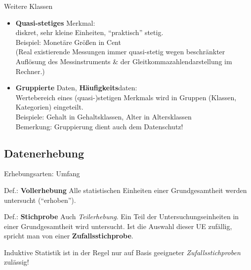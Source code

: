 \documentclass[
  10pt,
  ignorenonframetext,
]{beamer}
\providecommand{\tightlist}{%
  \setlength{\itemsep}{0pt}\setlength{\parskip}{0pt}}
\begin{document}
\begin{frame}{Weitere Klassen}
\label{weitere-klassen}
\begin{itemize}
\tightlist
\item
  \textbf{Quasi-stetiges} Merkmal:\\
  diskret, sehr kleine Einheiten, ``praktisch'' stetig.\\
  Beispiel: Monetäre Größen in Cent\\
  (Real existierende Messungen immer quasi-stetig wegen beschränkter
  Auflösung des Messinstruments \& der Gleitkommazahlendarstellung im
  Rechner.)
\item
  \textbf{Gruppierte} Daten, \textbf{Häufigkeits}daten:\\
  Wertebereich eines (quasi-)stetigen Merkmals wird in Gruppen (Klassen,
  Kategorien) eingeteilt.\\
  Beispiele: Gehalt in Gehaltsklassen, Alter in Altersklassen\\
  Bemerkung: Gruppierung dient auch dem Datenschutz!
\end{itemize}
\end{frame}

\subsection{Datenerhebung}\label{datenerhebung}

\begin{frame}{Erhebungsarten: Umfang}
\label{erhebungsarten-umfang}
\begin{block}{Def.: \textbf{Vollerhebung}}
\label{def.-vollerhebung}
Alle statistischen Einheiten einer Grundgesamtheit werden untersucht
(``erhoben'').
\end{block}

\begin{block}{Def.: \textbf{Stichprobe}}
\label{def.-stichprobe}
Auch \emph{Teilerhebung}. Ein Teil der Untersuchungseinheiten in einer
Grundgesamtheit wird untersucht. Ist die Auswahl dieser UE zufällig,
spricht man von einer \textbf{Zufallsstichprobe}.
\end{block}

Induktive Statistik ist in der Regel nur auf Basis geeigneter
\emph{Zufallsstichproben} zulässig!
\end{frame}
\end{document}
